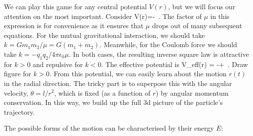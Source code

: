 \para
We can play this game for any central potential $V(r)$, but we will  focus our attention on the most important. {\co Consider
%
\be V(r)=-\ .\ee
%
}
The factor of $\mu$ in this expression is for convenience as it ensures that $\mu$ drops out of many subsequent equations. {\co For the mutual gravitational interaction, we should take $k=Gm_1m_2/\mu = G(m_1+m_2)$. Meanwhile, for the Coulomb force we should take $k=-q_1q_2/4\pi\epsilon_0\mu$.  In both cases, the resulting inverse square law is attractive for $k>0$ and repulsive for $k<0$.
 The effective potential is 
%
\be V_{\rm eff}(r) = -+\ .\ee
%
{\cblue Draw figure for $k>0$.}} From this potential, we can easily learn about the motion $r(t)$ in the radial direction. The tricky part is to superpose this with the angular velocity, $\dot{\theta}= l/r^2$, which is fixed (as a function of $r$) by angular momentum conservation. In this way, we build up the full 3d picture of the particle's trajectory.





\para
The possible forms of the motion can be characterised by their energy $E$:
%

